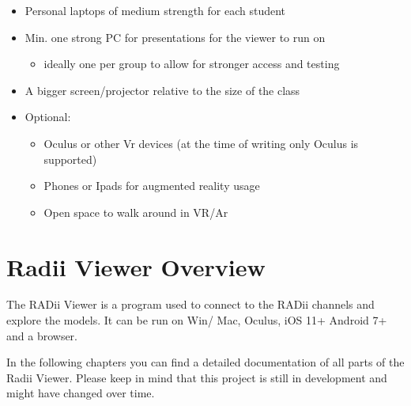 \documentclass[letterpaper,10pt,english]{sphinxmanual}
\begin{document}
\sphinxAtStartPar
{}
\begin{itemize}
\item {} 
\sphinxAtStartPar
Personal laptops of medium strength for each student

\item {} 
\sphinxAtStartPar
Min. one strong PC for presentations for the viewer to run on
\begin{itemize}
\item {} 
\sphinxAtStartPar
ideally one per group to allow for stronger access and testing

\end{itemize}

\item {} 
\sphinxAtStartPar
A bigger screen/projector relative to the size of the class

\item {} 
\sphinxAtStartPar
Optional:
\begin{itemize}
\item {} 
\sphinxAtStartPar
Oculus or other Vr devices (at the time of writing only Oculus is supported)

\item {} 
\sphinxAtStartPar
Phones or Ipads for augmented reality usage

\item {} 
\sphinxAtStartPar
Open space to walk around in VR/Ar

\end{itemize}

\end{itemize}

\sphinxAtStartPar
{}

\sphinxAtStartPar
{}

\sphinxstepscope


\section{Radii Viewer Overview}
\label{\detokenize{tutorial/Viewer_PC/documentation_rst/0_Viewer:radii-viewer-overview}}\label{\detokenize{tutorial/Viewer_PC/documentation_rst/0_Viewer::doc}}
\sphinxAtStartPar
The RADii Viewer is a program used to connect to the RADii channels and explore the models.
It can be run on Win/ Mac, Oculus, iOS 11+ Android 7+ and a browser.

\sphinxAtStartPar
In the following chapters you can find a detailed documentation of all parts of the Radii Viewer. Please keep in mind that this project is still in
development and might have changed over time.
\end{document}
